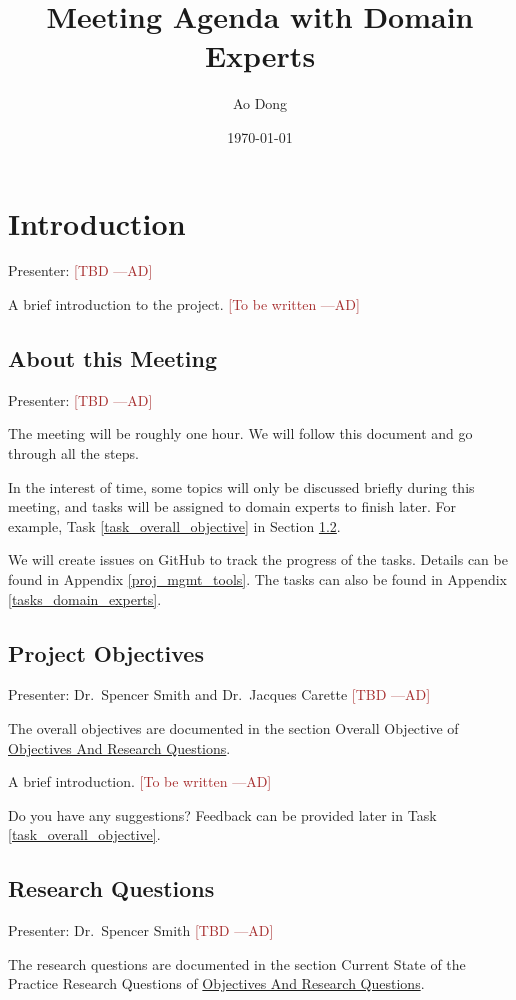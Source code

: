 \documentclass[12pt]{article}
\title{Meeting Agenda with Domain Experts}
\author{Ao Dong}
\date{\today}
\newcommand{\authornote}[3]{\textcolor{#1}{[#3 ---#2]}}
\newcommand{\authornote}[3]{}
\newcommand{\ad}[1]{\authornote{brown}{AD}{#1}} %
\begin{document}
\maketitle

\section{Introduction}
Presenter: \ad{TBD}

A brief introduction to the project. \ad{To be written}

\subsection{About this Meeting}
Presenter: \ad{TBD}

The meeting will be roughly one hour. We will follow this document and go
through all the steps.

In the interest of time, some topics will only be discussed briefly during this
meeting, and tasks will be assigned to domain experts to finish later. For
example, Task \ref{task_overall_objective} in Section \ref{project_objectives}.

We will create issues on GitHub to track the progress of the tasks. Details can
be found in Appendix \ref{proj_mgmt_tools}. The tasks can also be found in
Appendix \ref{tasks_domain_experts}.

\subsection{Project Objectives}
\label{project_objectives}
Presenter: Dr.\ Spencer Smith and Dr.\ Jacques Carette \ad{TBD}

The overall objectives are documented in the section Overall Objective of
\href{https://github.com/smiths/AIMSS/blob/master/OverallResearchProposal/ObjectivesAndResearchQuestions.pdf}{Objectives
And Research Questions}.

A brief introduction. \ad{To be written}

Do you have any suggestions? Feedback can be provided later in Task
\ref{task_overall_objective}.

\subsection{Research Questions}
\label{research_questions}
Presenter: Dr.\ Spencer Smith \ad{TBD}

The research questions are documented in the section Current State of the
Practice Research Questions of
\href{https://github.com/smiths/AIMSS/blob/master/OverallResearchProposal/ObjectivesAndResearchQuestions.pdf}{Objectives
And Research Questions}.
\end{document}
